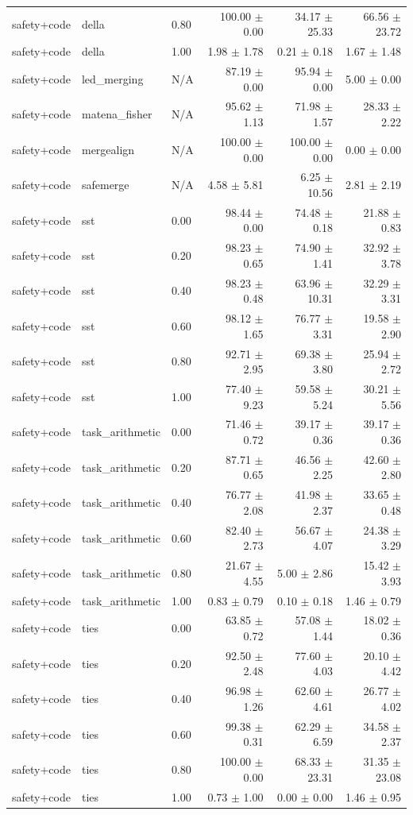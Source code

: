\begin{table}[H]
{\begin{tabular}{lllrrr}
safety+code & della & 0.80 & 100.00 $\pm$ 0.00 & 34.17 $\pm$ 25.33 & 66.56 $\pm$ 23.72 \\
safety+code & della & 1.00 & 1.98 $\pm$ 1.78 & 0.21 $\pm$ 0.18 & 1.67 $\pm$ 1.48 \\
safety+code & led\_merging & N/A & 87.19 $\pm$ 0.00 & 95.94 $\pm$ 0.00 & 5.00 $\pm$ 0.00 \\
safety+code & matena\_fisher & N/A & 95.62 $\pm$ 1.13 & 71.98 $\pm$ 1.57 & 28.33 $\pm$ 2.22 \\
safety+code & mergealign & N/A & 100.00 $\pm$ 0.00 & 100.00 $\pm$ 0.00 & 0.00 $\pm$ 0.00 \\
safety+code & safemerge & N/A & 4.58 $\pm$ 5.81 & 6.25 $\pm$ 10.56 & 2.81 $\pm$ 2.19 \\
safety+code & sst & 0.00 & 98.44 $\pm$ 0.00 & 74.48 $\pm$ 0.18 & 21.88 $\pm$ 0.83 \\
safety+code & sst & 0.20 & 98.23 $\pm$ 0.65 & 74.90 $\pm$ 1.41 & 32.92 $\pm$ 3.78 \\
safety+code & sst & 0.40 & 98.23 $\pm$ 0.48 & 63.96 $\pm$ 10.31 & 32.29 $\pm$ 3.31 \\
safety+code & sst & 0.60 & 98.12 $\pm$ 1.65 & 76.77 $\pm$ 3.31 & 19.58 $\pm$ 2.90 \\
safety+code & sst & 0.80 & 92.71 $\pm$ 2.95 & 69.38 $\pm$ 3.80 & 25.94 $\pm$ 2.72 \\
safety+code & sst & 1.00 & 77.40 $\pm$ 9.23 & 59.58 $\pm$ 5.24 & 30.21 $\pm$ 5.56 \\
safety+code & task\_arithmetic & 0.00 & 71.46 $\pm$ 0.72 & 39.17 $\pm$ 0.36 & 39.17 $\pm$ 0.36 \\
safety+code & task\_arithmetic & 0.20 & 87.71 $\pm$ 0.65 & 46.56 $\pm$ 2.25 & 42.60 $\pm$ 2.80 \\
safety+code & task\_arithmetic & 0.40 & 76.77 $\pm$ 2.08 & 41.98 $\pm$ 2.37 & 33.65 $\pm$ 0.48 \\
safety+code & task\_arithmetic & 0.60 & 82.40 $\pm$ 2.73 & 56.67 $\pm$ 4.07 & 24.38 $\pm$ 3.29 \\
safety+code & task\_arithmetic & 0.80 & 21.67 $\pm$ 4.55 & 5.00 $\pm$ 2.86 & 15.42 $\pm$ 3.93 \\
safety+code & task\_arithmetic & 1.00 & 0.83 $\pm$ 0.79 & 0.10 $\pm$ 0.18 & 1.46 $\pm$ 0.79 \\
safety+code & ties & 0.00 & 63.85 $\pm$ 0.72 & 57.08 $\pm$ 1.44 & 18.02 $\pm$ 0.36 \\
safety+code & ties & 0.20 & 92.50 $\pm$ 2.48 & 77.60 $\pm$ 4.03 & 20.10 $\pm$ 4.42 \\
safety+code & ties & 0.40 & 96.98 $\pm$ 1.26 & 62.60 $\pm$ 4.61 & 26.77 $\pm$ 4.02 \\
safety+code & ties & 0.60 & 99.38 $\pm$ 0.31 & 62.29 $\pm$ 6.59 & 34.58 $\pm$ 2.37 \\
safety+code & ties & 0.80 & 100.00 $\pm$ 0.00 & 68.33 $\pm$ 23.31 & 31.35 $\pm$ 23.08 \\
safety+code & ties & 1.00 & 0.73 $\pm$ 1.00 & 0.00 $\pm$ 0.00 & 1.46 $\pm$ 0.95 \\
\bottomrule
\end{tabular}
}
\end{table}